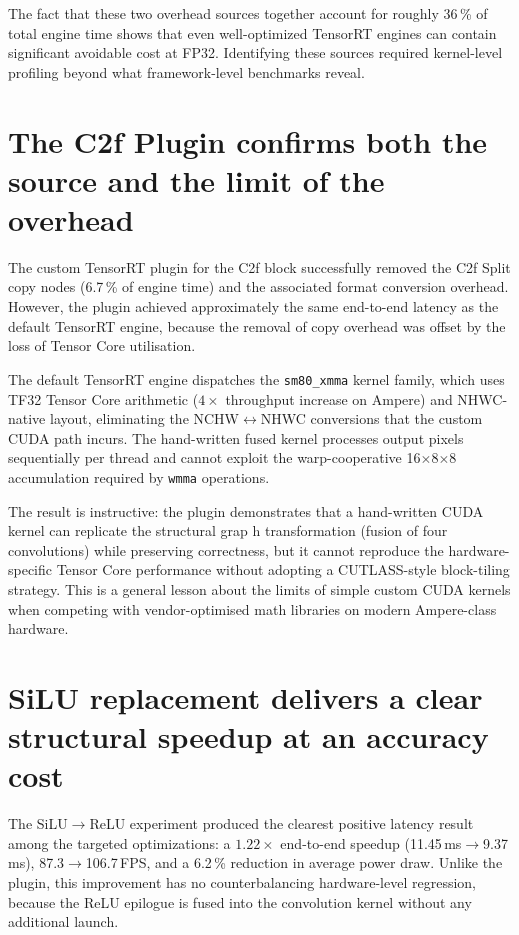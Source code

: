 \documentclass[12pt,a4paper]{report}
\begin{document}
The fact that these two overhead sources together account for roughly 36\,\% of total engine time shows that even
well-optimized TensorRT engines can contain significant avoidable cost at FP32.
Identifying these sources required kernel-level profiling beyond what framework-level benchmarks reveal.

\section{The C2f Plugin confirms both the source and the limit of the overhead}

The custom TensorRT plugin for the C2f block successfully removed the C2f Split copy nodes (6.7\,\% of engine time)
and the associated format conversion overhead.
However, the plugin achieved approximately the same end-to-end latency as the default TensorRT engine, because the
removal of copy overhead was offset by the loss of Tensor Core utilisation.

The default TensorRT engine dispatches the \texttt{sm80\_xmma} kernel family, which uses TF32 Tensor Core arithmetic
($4\times$ throughput increase on Ampere) and NHWC-native layout, eliminating the NCHW$\leftrightarrow$NHWC conversions
that the custom CUDA path incurs.
The hand-written fused kernel processes output pixels sequentially per thread and cannot exploit the warp-cooperative
16$\times$8$\times$8 accumulation required by \texttt{wmma} operations.

The result is instructive: the plugin demonstrates that a hand-written CUDA kernel can replicate the structural grap
h transformation (fusion of four convolutions) while preserving correctness, but it cannot reproduce the
hardware-specific Tensor Core performance without adopting a CUTLASS-style block-tiling strategy.
This is a general lesson about the limits of simple custom CUDA kernels when competing with vendor-optimised math
libraries on modern Ampere-class hardware.

\section{SiLU replacement delivers a clear structural speedup at an accuracy cost}

The SiLU$\to$ReLU experiment produced the clearest positive latency result among the targeted optimizations: a
$1.22\times$ end-to-end speedup (11.45\,ms$\to$9.37\,ms), 87.3$\to$106.7\,FPS, and a 6.2\,\% reduction in average power draw.
Unlike the plugin, this improvement has no counterbalancing hardware-level regression, because the ReLU epilogue is
fused into the convolution kernel without any additional launch.
\end{document}
